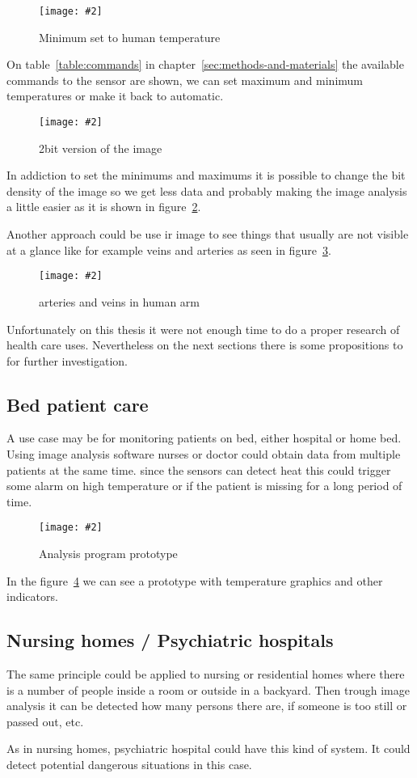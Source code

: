 \documentclass[hidelinks,11pt,a4paper,oneside,article]{memoir}
\newcommand{\putimage}[3][10] %
{
\begin{figure}[h]
	\centering
	\captionsetup{justification=centering}
	\texttt{[image: \#2]}
	\caption{#3}
	\label{fig:#2}
\end{figure}
}
\begin{document}
    \putimage{setminimum}{Minimum set to human temperature}

On table~\ref{table:commands} in chapter~\ref{sec:methods-and-materials} the available commands to the sensor are shown, we can set maximum and minimum temperatures or make it back to automatic.

    \putimage{2bit}{2bit version of the image}

In addiction to set the minimums and maximums it is possible to change the bit density of the image so we get less data and probably making the image analysis a little easier as it is shown in figure~\ref{fig:2bit}.

Another approach could be use ir image to see things that usually are not visible at a glance like for example veins and arteries as seen in figure~\ref{fig:vein}.

	\putimage{vein}{arteries and veins in human arm}
	
Unfortunately on this thesis it were not enough time to do a proper research of health care uses. Nevertheless on the next sections there is some propositions to for further investigation.

\subsection{Bed patient care}
A use case may be for monitoring patients on bed, either hospital or home bed. Using image analysis software nurses or doctor could obtain data from multiple patients at the same time. since the sensors can detect heat this could trigger some alarm on high temperature or if the patient is missing for a long period of time.

    \putimage{fiber-detector-prototype}{Analysis program prototype}
    
In the figure~\ref{fig:fiber-detector-prototype} we can see a prototype with temperature graphics and other indicators.
    
\subsection{Nursing homes / Psychiatric hospitals}
The same principle could be applied to nursing or residential homes where there is a number of people inside a room or outside in a backyard. Then trough image analysis it can be detected how many persons there are, if someone is too still or passed out, etc.

As in nursing homes, psychiatric hospital could have this kind of system. It could detect potential dangerous situations in this case.
\end{document}
